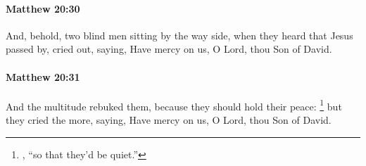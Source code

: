		\paragraph{Matthew 20:30} %
			\label{MATTHEW-20-30}

			And, behold, two blind men sitting by the way side, when they heard that Jesus passed by, cried out, saying, Have mercy on us, O Lord, thou Son of David.

			\begin{framed}
			\scriptsize
				\begin{compactdesc}
					\item[SBLG] 
				\end{compactdesc}
			\end{framed}

		\paragraph{Matthew 20:31} %
			\label{MATTHEW-20-31}

			And the multitude rebuked them, because they should hold their peace:%
				\footnote{%
					, ``so that they'd be quiet.''
					}
			but they cried the more, saying, Have mercy on us, O Lord, thou Son of David.

